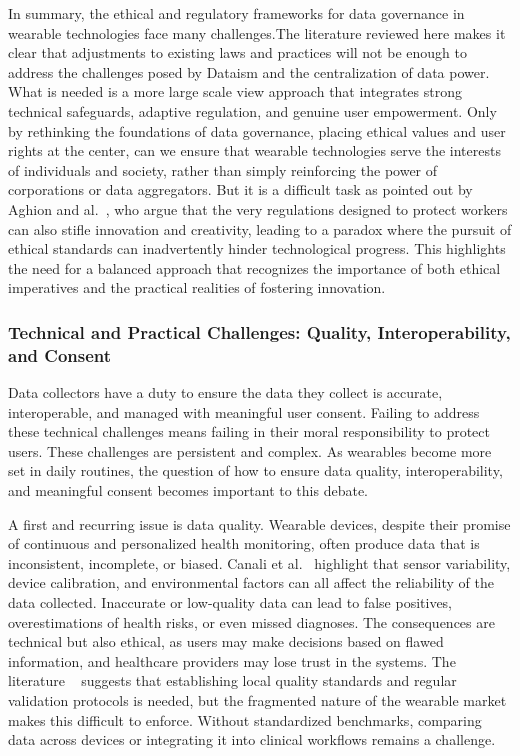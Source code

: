 	In summary, the ethical and regulatory frameworks for data governance in wearable technologies face many challenges.The literature reviewed here makes it clear that adjustments to existing laws and practices will not be enough to address the challenges posed by Dataism and the centralization of data power. What is needed is a more large scale view approach that integrates strong technical safeguards, adaptive regulation, and genuine user empowerment. 
	Only by rethinking the foundations of data governance, placing ethical values and user rights at the center, can we ensure that wearable technologies serve the interests of individuals and society, rather than simply reinforcing the 
	power of corporations or data aggregators. But it is a difficult task as pointed out by Aghion and al.~\cite{Aghion2021}, who argue that the very regulations designed to protect workers can also stifle innovation and creativity, leading to a paradox where the pursuit of ethical standards can inadvertently hinder technological progress. This highlights the need for a balanced approach that recognizes the importance of both ethical imperatives and the practical realities of fostering innovation.
	\subsubsection{Technical and Practical Challenges: Quality, Interoperability, and Consent}

	Data collectors have a duty to ensure the data they collect is accurate, interoperable, and managed with meaningful user consent. Failing to address these technical challenges means failing in their moral responsibility to protect users. These challenges are persistent and complex. As wearables become more set in daily routines, the question of how to ensure data quality, interoperability, and meaningful consent becomes important to this debate.

	A first and recurring issue is data quality. Wearable devices, despite their promise of continuous and personalized health monitoring, often produce data that is inconsistent, incomplete, or biased. Canali et al.~\cite{Canali2022} highlight that sensor variability, device calibration, and environmental factors can all affect the reliability of the data collected. Inaccurate or low-quality data can lead to false positives, overestimations of health risks, or even missed diagnoses. The consequences are technical but also ethical, as users may make decisions based on flawed information, and healthcare providers may lose trust in the systems. The literature ~\cite{Canali2022} suggests that establishing local quality standards and regular validation protocols is needed, but the fragmented nature of the wearable market makes this difficult to enforce. Without standardized benchmarks, comparing data across devices or integrating it into clinical workflows remains a challenge.


